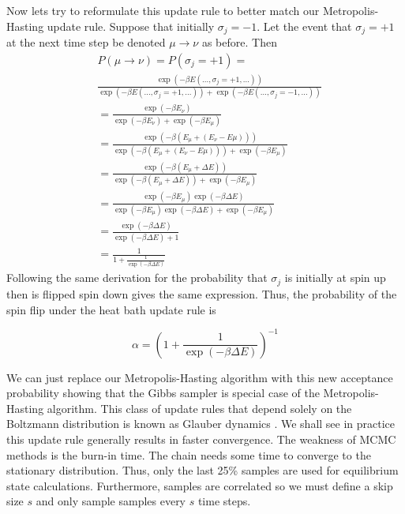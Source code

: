 \documentclass{article}
\begin{document}
Now lets try to reformulate this update rule to better match our Metropolis-Hasting update rule. 
Suppose that initially $\sigma_j = -1$. Let the event that $\sigma_j = +1$ at the next time step be denoted $\mu \rightarrow \nu$ as before.
Then 
\begin{align}
    &P(\mu \rightarrow \nu) = P(\sigma_j = +1) = \\
    &\frac{\exp(-\beta E(\ldots, \sigma_j = +1, \ldots))}{\exp(-\beta E(\ldots, \sigma_j = +1, \ldots)) + \exp(-\beta E(\ldots, \sigma_j = -1, \ldots))} \\
    &= \frac{\exp(-\beta E_{\nu})}{\exp(-\beta E_{\nu}) + \exp(-\beta E_{\mu})} \\
    &= \frac{\exp(-\beta (E_{\mu} + (E_{\nu} - E{\mu})))}{\exp(-\beta (E_{\mu} + (E_{\nu} - E{\mu}))) + \exp(-\beta E_{\mu})} \\
    &= \frac{\exp(-\beta (E_{\mu} + \Delta E))}{\exp(-\beta (E_{\mu} + \Delta E)) + \exp(-\beta E_{\mu})} \\
    &= \frac{\exp(-\beta E_{\mu}) \exp(-\beta \Delta E)}{\exp(-\beta E_{\mu}) \exp(-\beta \Delta E) + \exp(-\beta E_{\mu})} \\
    &= \frac{\exp(-\beta \Delta E)}{\exp(-\beta \Delta E) + 1} \\
    &= \frac{1}{1 + \frac{1}{\exp(-\beta \Delta E)}}
\end{align}
Following the same derivation for the probability that $\sigma_j$ is initially at spin up then is flipped spin down gives the same expression.
Thus, the probability of the spin flip under the heat bath update rule is 

\begin{equation}
    \alpha = \left(1 + \frac{1}{\exp(-\beta \Delta E)}\right)^{-1}
\end{equation}

We can just replace our Metropolis-Hasting algorithm with this new acceptance probability showing that the Gibbs sampler is special case of the Metropolis-Hasting algorithm. 
This class of update rules that depend solely on the Boltzmann distribution is known as Glauber dynamics \cite{Martinelli1999}. We shall see in practice this update rule generally results in faster convergence.
The weakness of MCMC methods is the burn-in time. The chain needs some time to converge to the stationary distribution. Thus, only the last 25\% samples are used for equilibrium state calculations.
Furthermore, samples are correlated so we must define a skip size $s$ and only sample samples every $s$ time steps.
\end{document}

